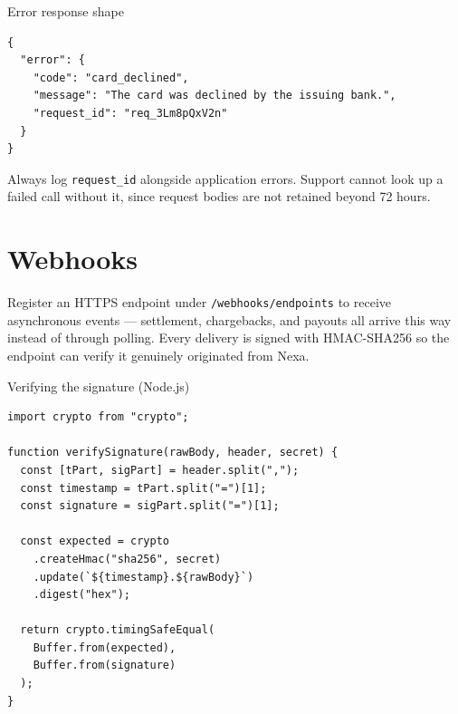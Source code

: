 \documentclass[10pt]{article}
\begin{document}
\vspace{1mm}
\begin{codepanel}{Error response shape}
\begin{lstlisting}[style=nexajson]
{
  "error": {
    "code": "card_declined",
    "message": "The card was declined by the issuing bank.",
    "request_id": "req_3Lm8pQxV2n"
  }
}
\end{lstlisting}
\end{codepanel}

\begin{infobox}
Always log \texttt{request\_id} alongside application errors. Support cannot look up a
failed call without it, since request bodies are not retained beyond 72 hours.
\end{infobox}

\section{Webhooks}

Register an HTTPS endpoint under \texttt{/webhooks/endpoints} to receive asynchronous
events --- settlement, chargebacks, and payouts all arrive this way instead of through
polling. Every delivery is signed with HMAC-SHA256 so the endpoint can verify it
genuinely originated from Nexa.

\begin{codepanel}{Verifying the signature (Node.js)}
\begin{lstlisting}[style=nexajs]
import crypto from "crypto";

function verifySignature(rawBody, header, secret) {
  const [tPart, sigPart] = header.split(",");
  const timestamp = tPart.split("=")[1];
  const signature = sigPart.split("=")[1];

  const expected = crypto
    .createHmac("sha256", secret)
    .update(`${timestamp}.${rawBody}`)
    .digest("hex");

  return crypto.timingSafeEqual(
    Buffer.from(expected),
    Buffer.from(signature)
  );
}
\end{lstlisting}
\end{codepanel}
\end{document}
